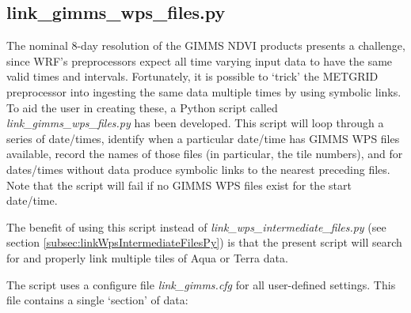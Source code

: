 \documentclass{article}
\begin{document}
\subsection{link\_gimms\_wps\_files.py}
\label{subsec:linkGimmsWpsFilesPy}

The nominal 8-day resolution of the GIMMS NDVI products presents a challenge,
since WRF's preprocessors expect all time varying input data to have the same
valid times and intervals.  Fortunately, it is possible to `trick' the 
METGRID preprocessor into ingesting the same data multiple times by using
symbolic links.  To aid the user in creating these, a Python script called
\textit{link\_gimms\_wps\_files.py} has been developed.  This script will
loop through a series of date/times, identify when a particular date/time
has GIMMS WPS files available, record the names of those files (in particular,
the tile numbers), and for dates/times without data produce symbolic links to 
the nearest preceding files.  Note that the script will fail if no GIMMS WPS 
files exist for the start date/time.

The benefit of using this script instead of 
\textit{link\_wps\_intermediate\_files.py} (see 
section \ref{subsec:linkWpsIntermediateFilesPy}) is that the present script
will search for and properly link multiple tiles of Aqua or Terra data.

The script uses a configure file \textit{link\_gimms.cfg} for all user-defined
settings.  This file contains a single `section' of data: \\
\end{document}
